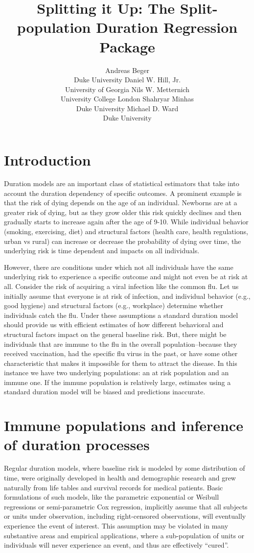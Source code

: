 \documentclass[article]{jss}
\author{
Andreas Beger\\Duke University \And Daniel W. Hill, Jr.\\University of Georgia \AND Nils W. Metternich\\University College London \And Shahryar Minhas\\Duke University \And Michael D. Ward\\Duke University
}
\title{Splitting it Up: The \pkg{spduration} Split-population Duration
Regression Package}
\begin{document}
\section{Introduction}\label{introduction}

Duration models are an important class of statistical estimators that
take into account the duration dependency of specific outcomes. A
prominent example is that the risk of dying depends on the age of an
individual. Newborns are at a greater risk of dying, but as they grow
older this risk quickly declines and then gradually starts to increase
again after the age of 9-10. While individual behavior (smoking,
exercising, diet) and structural factors (health care, health
regulations, urban vs rural) can increase or decrease the probability of
dying over time, the underlying risk is time dependent and impacts on
all individuals.

However, there are conditions under which not all individuals have the
same underlying risk to experience a specific outcome and might not even
be at risk at all. Consider the risk of acquiring a viral infection like
the common flu. Let us initially assume that everyone is at risk of
infection, and individual behavior (e.g., good hygiene) and structural
factors (e.g., workplace) determine whether individuals catch the flu.
Under these assumptions a standard duration model should provide us with
efficient estimates of how different behavioral and structural factors
impact on the general baseline risk. But, there might be individuals
that are immune to the flu in the overall population--because they
received vaccination, had the specific flu virus in the past, or have
some other characteristic that makes it impossible for them to attract
the disease. In this instance we have two underlying populations: an at
risk population and an immune one. If the immune population is
relatively large, estimates using a standard duration model will be
biased and predictions inaccurate.

\section{Immune populations and inference of duration
processes}\label{immune-populations-and-inference-of-duration-processes}

Regular duration models, where baseline risk is modeled by some
distribution of time, were originally developed in health and
demographic research and grew naturally from life tables and survival
records for medical patients. Basic formulations of such models, like
the parametric exponential or Weibull regressions or semi-parametric Cox
regression, implicitly assume that all subjects or units under
observation, including right-censored observations, will eventually
experience the event of interest. This assumption may be violated in
many substantive areas and empirical applications, where a
sub-population of units or individuals will never experience an event,
and thus are effectively ``cured''.
\end{document}
